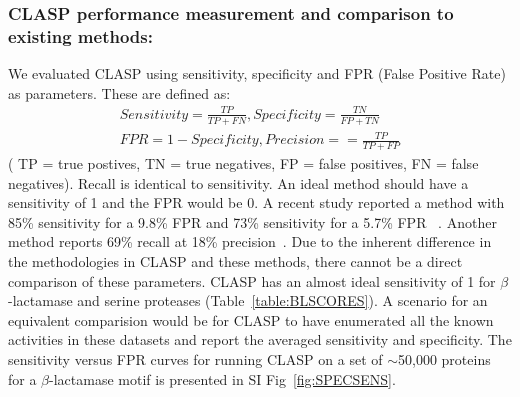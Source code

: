 
\subsubsection{CLASP performance measurement and comparison to existing methods:}
We evaluated CLASP using sensitivity, specificity and FPR (False Positive Rate) as parameters. These are defined as:
\begin{align*}
  Sensitivity = \frac{TP}{TP + FN} ,  Specificity = \frac{TN}{FP + TN}  \\
  FPR = 1-Specificity  ,   Precision =  = \frac{TP}{TP + FP}  
\end{align*}
( TP = true postives, TN = true negatives, FP = false positives, FN = false negatives).
Recall is identical to sensitivity. An ideal method should have a sensitivity of 1 and the FPR would be 0. 
A recent study reported a method with 85\% sensitivity for a 9.8\% FPR and 73\% sensitivity for a 5.7\% FPR ~\citep{RESBOOST}. 
Another method reports 69\% recall at 18\% precision~\citep{DISCERN}. 
Due to the inherent difference in the methodologies in CLASP and these methods, there cannot be a direct comparison of these parameters. CLASP has an almost ideal sensitivity of 1 for $\beta$-lactamase and serine proteases (Table~\ref{table:BLSCORES}).
A scenario for an equivalent comparision would be for CLASP to have enumerated all the known activities in these datasets and report
the averaged sensitivity and specificity. 
The sensitivity versus FPR curves for running CLASP on a set of $\sim$50,000 proteins for a $\beta$-lactamase motif is 
presented in SI Fig~\ref{fig:SPECSENS}. 
